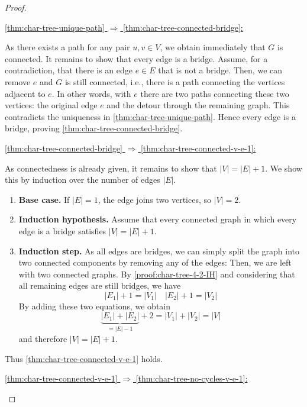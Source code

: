 \begin{proof}
\hypertarget{proof:char-tree-6-4}{
\underline{\ref{thm:char-tree-unique-path} $\Rightarrow$
          \ref{thm:char-tree-connected-bridge}:}}

As there exists a path for any pair $u,v\in V$, we obtain immediately that $G$ is connected. 
It remains to show that every edge is a bridge. 
Assume, for a contradiction, that there is an edge $e\in E$ that is not a bridge. 
Then, we can remove $e$ and $G$ is still connected, i.e., there is a path connecting the vertices adjacent to $e$.
In other words, with $e$ there are two paths connecting these two vertices: 
the original edge $e$ and the detour through the remaining graph.
This contradicts the uniqueness in \ref{thm:char-tree-unique-path}.
Hence every edge is a bridge, proving \ref{thm:char-tree-connected-bridge}.

\hypertarget{proof:char-tree-4-2}{
\underline{\ref{thm:char-tree-connected-bridge} $\Rightarrow$
          \ref{thm:char-tree-connected-v-e-1}:}}

As connectedness is already given, it remains to show that $|V|=|E|+1$.
We show this by induction over the number of edges \(|E|\).
  \begin{enumerate}[partopsep=0em, topsep=0em, label=(\roman*)]
    \item \textbf{Base case.}  
    If \(|E|=1\), the edge joins two vertices, so \(|V|=2\). \textcolor{Green}{}
    \item \textbf{Induction hypothesis.}  
    Assume that every connected graph in which every edge is a bridge satisfies \(|V| = |E| + 1\). 
    \label{proof:char-tree-4-2-IH}
    \item \textbf{Induction step.}  
    As all edges are bridges, we can simply split the graph into two connected components by removing any of the edges:
    Then, we are left with two connected graphs. By \ref{proof:char-tree-4-2-IH} and considering that all remaining edges are still bridges, we have
    $$
    \left|E_1\right|+1=\left|V_1\right| \quad\left|E_2\right|+1=\left|V_2\right|
    $$
    By adding these two equations, we obtain
    $$
    \underbrace{\left|E_1\right|+\left|E_2\right|}_{=|E|-1}+2=\left|V_1\right|+\left|V_2\right|=|V|
    $$
    and therefore \(|V|=|E|+1\). \textcolor{Green}{}
\end{enumerate}
Thus \ref{thm:char-tree-connected-v-e-1} holds.

\hypertarget{proof:char-tree-2-3}{
\underline{\ref{thm:char-tree-connected-v-e-1} $\Rightarrow$
          \ref{thm:char-tree-no-cycles-v-e-1}:}}


\end{proof}
